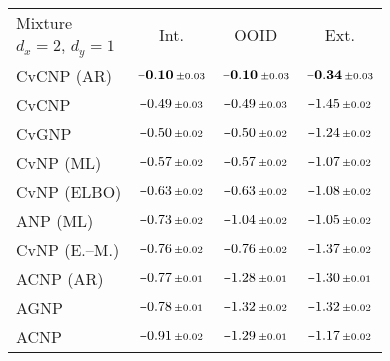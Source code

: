 \begin{tabular}[t]{lccc} 
\toprule 
Mixture & \multirow{2}{*}{Int.} & \multirow{2}{*}{OOID} & \multirow{2}{*}{Ext.} \\ 
$d_x\!=\!2,\,d_y\!=\!1$ \\ \midrule 
CvCNP (AR) & $\mathbf{\scalebox{0.7}[1]{$-$}0.10}\,{ \scriptstyle \pm  0.03 }$ & $\mathbf{\scalebox{0.7}[1]{$-$}0.10}\,{ \scriptstyle \pm  0.03 }$ & $\mathbf{\scalebox{0.7}[1]{$-$}0.34}\,{ \scriptstyle \pm  0.03 }$ \\ 
CvCNP & $\scalebox{0.7}[1]{$-$}0.49\,{ \scriptstyle \pm  0.03 }$ & $\scalebox{0.7}[1]{$-$}0.49\,{ \scriptstyle \pm  0.03 }$ & $\scalebox{0.7}[1]{$-$}1.45\,{ \scriptstyle \pm  0.02 }$ \\ 
CvGNP & $\scalebox{0.7}[1]{$-$}0.50\,{ \scriptstyle \pm  0.02 }$ & $\scalebox{0.7}[1]{$-$}0.50\,{ \scriptstyle \pm  0.02 }$ & $\scalebox{0.7}[1]{$-$}1.24\,{ \scriptstyle \pm  0.02 }$ \\ 
CvNP (ML) & $\scalebox{0.7}[1]{$-$}0.57\,{ \scriptstyle \pm  0.02 }$ & $\scalebox{0.7}[1]{$-$}0.57\,{ \scriptstyle \pm  0.02 }$ & $\scalebox{0.7}[1]{$-$}1.07\,{ \scriptstyle \pm  0.02 }$ \\ 
CvNP (ELBO) & $\scalebox{0.7}[1]{$-$}0.63\,{ \scriptstyle \pm  0.02 }$ & $\scalebox{0.7}[1]{$-$}0.63\,{ \scriptstyle \pm  0.02 }$ & $\scalebox{0.7}[1]{$-$}1.08\,{ \scriptstyle \pm  0.02 }$ \\ 
ANP (ML) & $\scalebox{0.7}[1]{$-$}0.73\,{ \scriptstyle \pm  0.02 }$ & $\scalebox{0.7}[1]{$-$}1.04\,{ \scriptstyle \pm  0.02 }$ & $\scalebox{0.7}[1]{$-$}1.05\,{ \scriptstyle \pm  0.02 }$ \\ 
CvNP (E.--M.) & $\scalebox{0.7}[1]{$-$}0.76\,{ \scriptstyle \pm  0.02 }$ & $\scalebox{0.7}[1]{$-$}0.76\,{ \scriptstyle \pm  0.02 }$ & $\scalebox{0.7}[1]{$-$}1.37\,{ \scriptstyle \pm  0.02 }$ \\ 
ACNP (AR) & $\scalebox{0.7}[1]{$-$}0.77\,{ \scriptstyle \pm  0.01 }$ & $\scalebox{0.7}[1]{$-$}1.28\,{ \scriptstyle \pm  0.01 }$ & $\scalebox{0.7}[1]{$-$}1.30\,{ \scriptstyle \pm  0.01 }$ \\ 
AGNP & $\scalebox{0.7}[1]{$-$}0.78\,{ \scriptstyle \pm  0.01 }$ & $\scalebox{0.7}[1]{$-$}1.32\,{ \scriptstyle \pm  0.02 }$ & $\scalebox{0.7}[1]{$-$}1.32\,{ \scriptstyle \pm  0.02 }$ \\ 
ACNP & $\scalebox{0.7}[1]{$-$}0.91\,{ \scriptstyle \pm  0.02 }$ & $\scalebox{0.7}[1]{$-$}1.29\,{ \scriptstyle \pm  0.01 }$ & $\scalebox{0.7}[1]{$-$}1.17\,{ \scriptstyle \pm  0.02 }$ \\ 

\end{tabular}
